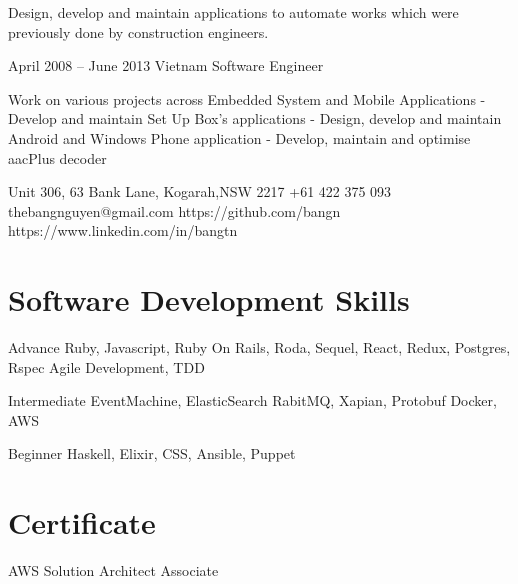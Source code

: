 \documentclass{tccv}
\begin{document}
\begin{eventlist}
    Design, develop and maintain applications to automate works which were previously done by construction engineers.

\item{April 2008 -- June 2013}
    {Vietnam}
    {Software Engineer}

    Work on various projects across Embedded System and Mobile Applications
    \newline - Develop and maintain Set Up Box's applications
    \newline - Design, develop and maintain Android and Windows Phone application
    \newline - Develop, maintain and optimise aacPlus decoder

\end{eventlist}

\personal
    {Unit 306, 63 Bank Lane, Kogarah,\newline NSW 2217}
    {+61 422 375 093}
    {thebangnguyen@gmail.com}
    {https://github.com/bangn}
    {https://www.linkedin.com/in/bangtn}

\section{Software Development Skills}

\begin{factlist}

\item{Advance}
    {Ruby, Javascript, Ruby On Rails, Roda, Sequel, React, Redux, Postgres, Rspec
    \newline Agile Development, TDD}

\item{Intermediate}
    {EventMachine, ElasticSearch
    \newline RabitMQ, Xapian, Protobuf
    \newline Docker, AWS}

\item{Beginner}
    {Haskell, Elixir, CSS, Ansible, Puppet}
\end{factlist}

\section{Certificate}

\begin{factlist}

\item{AWS Solution Architect}
    {Associate}

\end{factlist}
\end{document}
